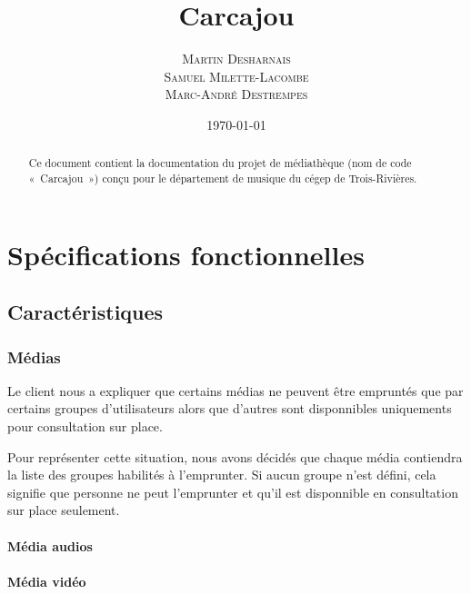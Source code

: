 \documentclass[letter, 11pt, draft]{report}
\begin{document}
\title{Carcajou}
\author{\textsc{Martin Desharnais} \\ \textsc{Samuel Milette-Lacombe} \\ \textsc{Marc-André Destrempes}}
\date{\today}

\maketitle

\begin{abstract}
Ce document contient la documentation du projet de médiathèque (nom de code «~Carcajou~») conçu pour le département de musique du cégep de Trois-Rivières.
\end{abstract}

\newpage
\tableofcontents
\newpage

\chapter{Spécifications fonctionnelles}

\section{Caractéristiques}

\subsection{Médias}

Le client nous a expliquer que certains médias ne peuvent être empruntés que par certains groupes d'utilisateurs alors que d'autres sont disponnibles uniquements pour consultation sur place.

Pour représenter cette situation, nous avons décidés que chaque média contiendra la liste des groupes habilités à l'emprunter. Si aucun groupe n'est défini, cela signifie que personne ne peut l'emprunter et qu'il est disponnible en consultation sur place seulement.

\subsubsection{Média audios}

\subsubsection{Média vidéo}
\end{document}
